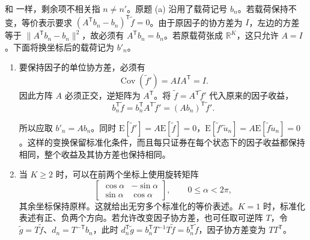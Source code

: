 \begin{solution}[label-content={证明},blank-type=manual,blank-vsep=9\baselineskip]
和 一样，剩余项不相关指 $n\ne n'$。原题 (a) 沿用了载荷记号 $b_n$。若载荷保持不变，等价表示要求 $(A^{\mathsf T}b_n-b_n)^{\mathsf T}\widetilde f=0$。由于原因子的协方差为 $I$，左边的方差等于 $\|A^{\mathsf T}b_n-b_n\|^2$，故必须有 $A^{\mathsf T}b_n=b_n$。若原载荷张成 $\mathbb R^K$，这只允许 $A=I$。下面将换坐标后的载荷记为 $b'_n$。

\begin{enumerate}[label=(\alph*)]
\item 要保持因子的单位协方差，必须有
\[
 \operatorname{Cov}(\widetilde f')=AIA^{\mathsf T}=I .
\]
因此方阵 $A$ 必须正交，逆矩阵为 $A^{\mathsf T}$。将 $\widetilde f=A^{\mathsf T}\widetilde f'$ 代入原来的因子收益，
\[
 b_n^{\mathsf T}\widetilde f=b_n^{\mathsf T}A^{\mathsf T}\widetilde f'
 =(Ab_n)^{\mathsf T}\widetilde f'.
\]

所以应取 $b'_n=Ab_n$。同时 $\mathrm E[\widetilde f']=A\mathrm E[\widetilde f]=0$，$\mathrm E[\widetilde f'\widetilde u_n]=A\mathrm E[\widetilde f\widetilde u_n]=0$。这样的变换保留标准化条件，而且每只证券在每个状态下的因子收益都保持相同，整个收益及其协方差也保持相同。
\item 当 $K\ge2$ 时，可以在前两个坐标上使用旋转矩阵
\[
 \begin{bmatrix}\cos\alpha&-\sin\alpha\\\sin\alpha&\cos\alpha\end{bmatrix},
 \qquad 0\le\alpha<2\pi,
\]
其余坐标保持原样。这就给出无穷多个标准化的等价表述。$K=1$ 时，标准化表述有正、负两个方向。若允许改变因子协方差，也可任取可逆阵 $T$，令 $\widetilde g=T\widetilde f$、$d_n=T^{-\mathsf T}b_n$，此时 $d_n^{\mathsf T}\widetilde g=b_n^{\mathsf T}T^{-1}T\widetilde f=b_n^{\mathsf T}\widetilde f$，因子协方差变为 $TT^{\mathsf T}$。\qedhere
\end{enumerate}
\end{solution}

